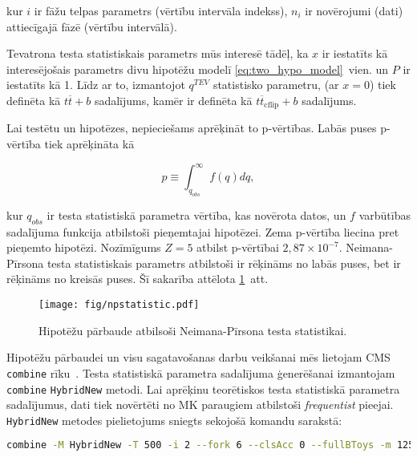 kur $i$ ir fāžu telpas parametrs (vērtību intervāla indekss), $n_{i}$ ir novērojumi (dati) attiecīgajā fāzē (vērtību intervālā).

Tevatrona testa statistiskais parametrs mūs interesē tādēļ, ka $x$ ir iestatīts kā interesējošais parametrs divu hipotēžu modelī \ref{eq:two_hypo_model}~vien. un $P$ ir iestatīts kā 1. Līdz ar to, izmantojot $q^{TEV}$ statistisko parametru, \Hnull (ar $x=0$) tiek definēta kā $t\overline{t}+b$ sadalījums, kamēr \Halt ir definēta kā $t\overline{t}_{\text{cflip}}+b$ sadalījums.

Lai testētu \Hnull un \Halt hipotēzes, nepieciešams aprēķināt to p-vērtības. Labās puses p-vērtība tiek aprēķināta kā

\begin{equation}
p\equiv\int_{q_{obs}}^{\infty}f(q)dq,
\end{equation}
    
kur $q_{obs}$ ir testa statistiskā parametra vērtība, kas novērota datos, un $f$ varbūtības sadalījuma funkcija atbilstoši pieņemtajai hipotēzei. Zema p-vērtība liecina pret pieņemto hipotēzi. Nozīmīgums $Z=5$ atbilst p-vērtībai $2,87\times10^{-7}$. Neimana-Pīrsona testa statistiskais parametrs atbilstoši \Hnull ir rēķināms no labās puses, bet \Halt ir rēķināms no kreisās puses. Šī sakarība attēlota \ref{fig:npstatistic}~att.

\begin{figure}
  \centering
  \texttt{[image: fig/npstatistic.pdf]}
  \caption{Hipotēžu pārbaude atbilsoši Neimana-Pīrsona testa statistikai.}
  \label{fig:npstatistic}
\end{figure}

Hipotēžu pārbaudei un visu sagatavošanas darbu veikšanai mēs lietojam CMS \lstinline[language=sh]|combine| rīku~\cite{url:combine}.
Testa statistiskā parametra sadalījuma ģenerēšanai izmantojam  \lstinline[language=sh]|combine| \lstinline[language=sh]|HybridNew| metodi. Lai aprēķinu teorētiskos testa statistiskā parametra sadalījumus, dati tiek novērtēti no MK paraugiem atbilstoši \textit{frequentist} pieejai. \lstinline[language=sh]|HybridNew| metodes pielietojums sniegts sekojošā komandu sarakstā:

\begin{lstlisting}[language=sh, breaklines=true]
  combine -M HybridNew -T 500 -i 2 --fork 6 --clsAcc 0 --fullBToys -m 125.7 TwoHypo.root --seed 8192 --testStat=TEV  --saveHybridResult --singlePoint 1
\end{lstlisting}

